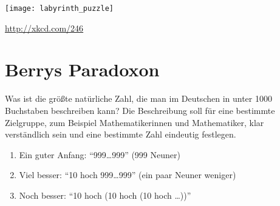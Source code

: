 \documentclass[twoside]{../zirkelblatt1415}
\theoremstyle{definition}
\theoremstyle{plain}
\theoremstyle{remark}
\newenvironment{listing}{
  \renewcommand*\theenumi{\arabic{enumi}}
  \renewcommand{\labelenumi}{\theenumi.}
  \begin{enumerate}\itemsep0em}{\end{enumerate}}
\begin{document}

\begin{center}
  \texttt{[image: labyrinth\_puzzle]}

  {\small \url{http://xkcd.com/246}\par}
\end{center}

{\renewcommand\contentsname{}\renewcommand{\addvspace}[1]{\vskip0.6em}\vspace{-1.5em}
\tableofcontents%
}


\section{Berrys Paradoxon}
\label{sect:berry}

Was ist die größte natürliche Zahl, die man im Deutschen in unter 1000
Buchstaben beschreiben kann? Die Beschreibung soll für eine bestimmte
Zielgruppe, zum Beispiel Mathematikerinnen und Mathematiker, klar verständlich
sein und eine bestimmte Zahl eindeutig festlegen.
\begin{listing}
\item Ein guter Anfang: "`999\ldots999"' (999 Neuner)
\item Viel besser: "`10 hoch 999\ldots999"' (ein paar Neuner weniger)
\item Noch besser: "`10 hoch (10 hoch (10 hoch \ldots))"'
\end{listing}
\end{document}
